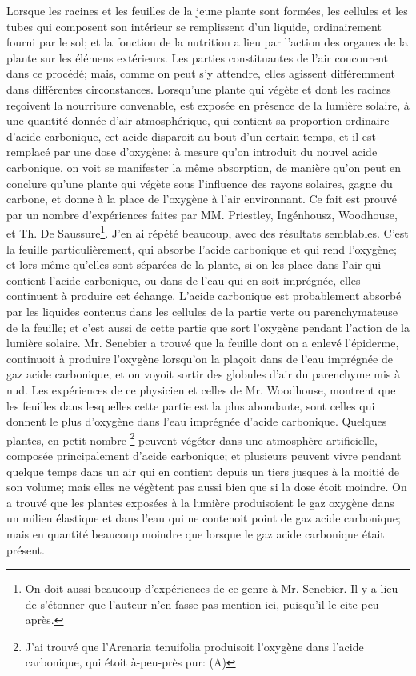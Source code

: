 Lorsque les racines et les feuilles de la jeune plante sont formées, les cellules et les tubes qui composent son intérieur se remplissent d'un liquide, ordinairement fourni par le sol; et la fonction de la nutrition a lieu par l'action des organes de la plante sur les élémens extérieurs. Les parties constituantes de l'air concourent dans ce procédé; mais, comme on peut s'y attendre, elles agissent différemment dans différentes circonstances.
Lorsqu'une plante qui végète et dont les racines reçoivent la nourriture convenable,\setcounter{page}{23} est exposée en présence de la lumière solaire, à une quantité donnée d'air atmosphérique, qui contient sa proportion ordinaire d'acide carbonique, cet acide disparoit au bout d'un certain temps, et il est remplacé par une dose d'oxygène; à mesure qu'on introduit du nouvel acide carbonique, on voit se manifester la même absorption, de manière qu'on peut en conclure qu'une plante qui végète sous l'influence des rayons solaires, gagne du carbone, et donne à la place de l'oxygène à l'air environnant.
Ce fait est prouvé par un nombre d'expériences faites par MM. Priestley, Ingénhousz, Woodhouse, et Th. De Saussure\footnote{On doit aussi beaucoup d'expériences de ce genre à Mr. Senebier. Il y a lieu de s'étonner que l'auteur n'en fasse pas mention ici, puisqu'il le cite peu après.}.
J'en ai répété beaucoup, avec des résultats semblables. C'est la feuille particulièrement, qui absorbe l'acide carbonique et qui rend l'oxygène; et lors même qu'elles sont séparées de la plante, si on les place dans l'air qui contient l'acide carbonique, ou dans de l'eau qui en soit imprégnée, elles continuent à produire cet échange.
L'acide carbonique est probablement absorbé par les liquides contenus dans les\setcounter{page}{24} cellules de la partie verte ou parenchymateuse de la feuille; et c'est aussi de cette partie que sort l'oxygène pendant l'action de la lumière solaire. Mr. Senebier a trouvé que la feuille dont on a enlevé l'épiderme, continuoit à produire l'oxygène lorsqu'on la plaçoit dans de l'eau imprégnée de gaz acide carbonique, et on voyoit sortir des globules d'air du parenchyme mis à nud. Les expériences de ce physicien et celles de Mr. Woodhouse, montrent que les feuilles dans lesquelles cette partie est la plus abondante, sont celles qui donnent le plus d'oxygène dans l'eau imprégnée d'acide carbonique. Quelques plantes, en petit nombre \footnote{J'ai trouvé que l'Arenaria tenuifolia produisoit l'oxygène dans l'acide carbonique, qui étoit à-peu-près pur: (A)} peuvent végéter dans une atmosphère artificielle, composée principalement d'acide carbonique; et plusieurs peuvent vivre pendant quelque temps dans un air qui en contient depuis un tiers jusques à la moitié de son volume; mais elles ne végètent pas aussi bien que si la dose étoit moindre. On a trouvé que les plantes exposées à la lumière produisoient le gaz oxygène dans un milieu élastique et dans l'eau qui ne contenoit point de gaz acide carbonique; mais\setcounter{page}{25} en quantité beaucoup moindre que lorsque le gaz acide carbonique était présent.
